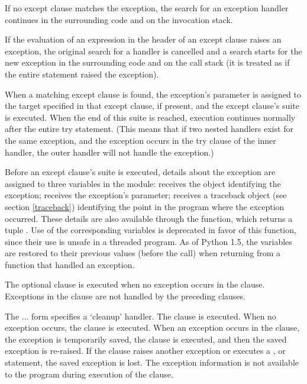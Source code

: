If no except clause matches the exception, the search for an exception
handler continues in the surrounding code and on the invocation stack.

If the evaluation of an expression in the header of an except clause
raises an exception, the original search for a handler is cancelled
and a search starts for the new exception in the surrounding code and
on the call stack (it is treated as if the entire  statement
raised the exception).

When a matching except clause is found, the exception's parameter is
assigned to the target specified in that except clause, if present,
and the except clause's suite is executed.  When the end of this suite
is reached, execution continues normally after the entire try
statement.  (This means that if two nested handlers exist for the same
exception, and the exception occurs in the try clause of the inner
handler, the outer handler will not handle the exception.)

Before an except clause's suite is executed, details about the
exception are assigned to three variables in the  module:
 receives the object identifying the exception;
 receives the exception's parameter;
 receives a traceback object (see section
\ref{traceback}) identifying the point in the program where the
exception occurred.
These details are also available through the 
function, which returns a tuple  
.  Use of the corresponding variables is
deprecated in favor of this function, since their use is unsafe in a
threaded program.  As of Python 1.5, the variables are restored to
their previous values (before the call) when returning from a function
that handled an exception.

The optional  clause is executed when no exception occurs
in the  clause.  Exceptions in the  clause are
not handled by the preceding  clauses.

The ... form specifies a `cleanup' handler.  The
 clause is executed.  When no exception occurs, the
 clause is executed.  When an exception occurs in the
 clause, the exception is temporarily saved, the
 clause is executed, and then the saved exception is
re-raised.  If the  clause raises another exception or
executes a ,  or  statement,
the saved exception is lost.  The exception information is not
available to the program during execution of the 
clause.

